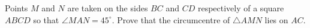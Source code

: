 Points $M$ and $N$ are taken on the sides $BC$ and $CD$ respectively of a square $ABCD$ so that $\angle MAN=45^{\circ}$. Prove that the circumcentre of $\triangle AMN$ lies on $AC$.